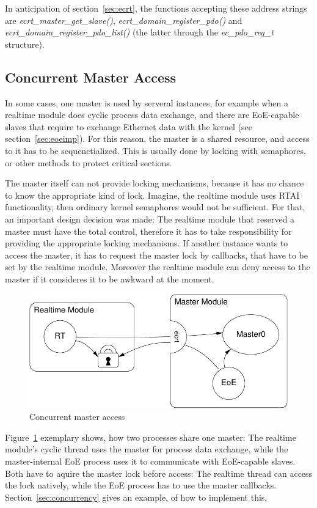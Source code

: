 \documentclass[a4paper,12pt,BCOR6mm,bibtotoc,idxtotoc]{scrbook}
\begin{document}
In anticipation of section~\ref{sec:ecrt}, the functions accepting
these address strings are \textit{ecrt\_\-master\_\-get\_slave()},
\textit{ecrt\_domain\_register\_pdo()} and
\textit{ecrt\_domain\_register\_pdo\_list()} (the latter through the
\textit{ec\_pdo\_reg\_t} structure).


\subsection{Concurrent Master Access}
\label{sec:concurr}

In some cases, one master is used by serveral instances, for example
when a realtime module does cyclic process data exchange, and there
are EoE-capable slaves that require to exchange Ethernet data with the
kernel (see section~\ref{sec:eoeimp}). For this reason, the master is
a shared resource, and access to it has to be sequenctialized. This is
usually done by locking with semaphores, or other methods to protect
critical sections.

The master itself can not provide locking mechanisms, because it has
no chance to know the appropriate kind of lock. Imagine, the realtime
module uses RTAI functionality, then ordinary kernel semaphores would
not be sufficient. For that, an important design decision was made:
The realtime module that reserved a master must have the total
control, therefore it has to take responsibility for providing the
appropriate locking mechanisms. If another instance wants to access
the master, it has to request the master lock by callbacks, that have
to be set by the realtime module. Moreover the realtime module can
deny access to the master if it consideres it to be awkward at the
moment.

\begin{figure}[htbp]
  \centering
  \includegraphics[width=.6\textwidth]{images/master-locks}
  \caption{Concurrent master access}
  \label{fig:locks}
\end{figure}

Figure~\ref{fig:locks} exemplary shows, how two processes share one
master: The realtime module's cyclic thread uses the master for
process data exchange, while the master-internal EoE process uses it
to communicate with EoE-capable slaves. Both have to aquire the master
lock before access: The realtime thread can access the lock natively,
while the EoE process has to use the master callbacks.
Section~\ref{sec:concurrency} gives an example, of how to implement
this.
\end{document}
